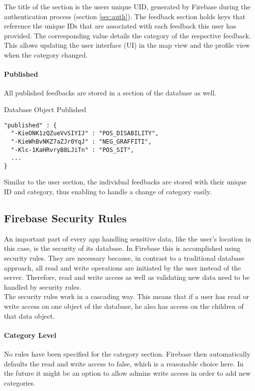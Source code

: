 The title of the section is the users unique UID, generated by Firebase during the authentication process (section \ref{sec:auth}). The feedback section holds keys that reference the unique IDs that are associated with each feedback this user has provided. The corresponding value details the category of the respective feedback. This allows updating the user interface (UI) in the map view and the profile view when the category changed.

\paragraph{Published}
All published feedbacks are stored in a section of the database as well.
\begin{listing}[H]
  \caption{Database Object Published}
  \label{mint:db_published}
  \begin{verbatim}
"published" : {
  "-KieONK1zQZueVvSIYIJ" : "POS_DISABILITY",
  "-KieWhBvNKZ7aZJr0YqJ" : "NEG_GRAFFITI",
  "-Klc-1KaHRvryB8LJiTn" : "POS_SIT",
  ...
}
  \end{verbatim}
\end{listing}

Similar to the user section, the individual feedbacks are stored with their unique ID and category, thus enabling to handle a change of category easily.



\subsection{Firebase Security Rules} \label{ssec:sec_rules}
An important part of every app handling sensitive data, like the user's location in this case, is the security of its database. In Firebase this is accomplished using security rules. They are necessary because, in contrast to a traditional database approach, all read and write operations are initiated by the user instead of the server. Therefore, read and write access as well as validating new data need to be handled by security rules.\\
The security rules work in a cascading way. This means that if a user has read or write access on one object of the database, he also has access on the children of that data object.

\paragraph{Category Level}
No rules have been specified for the category section. Firebase then automatically defaults the read and write access to false, which is a reasonable choice here. In the future it might be an option to allow admins write access in order to add new categories.


